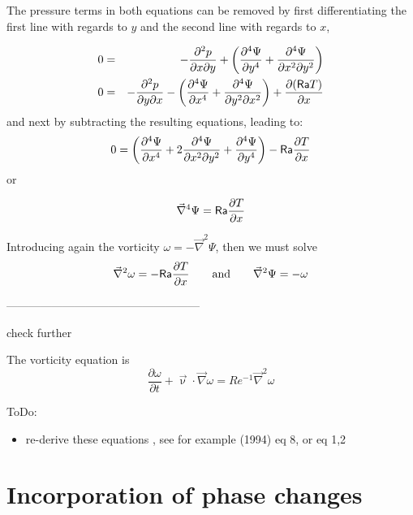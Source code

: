 The pressure terms in both equations can be removed by first differentiating
the first line with regards to $y$ and the second line with regards to $x$, 

\begin{eqnarray}
0 &=& -\frac{\partial^2 p}{\partial x\partial y} +  \left(
\frac{\partial^4 \Psi}{\partial y^4}  + \frac{\partial^4 \Psi}{\partial x^2 \partial y^2} 
\right)  \nonumber\\
0 &=& -\frac{\partial^2 p}{\partial y \partial x} -  \left(
\frac{\partial^4 \Psi}{\partial x^4}  + \frac{\partial^4 \Psi}{\partial y^2 \partial x^2} 
\right) + \frac{\partial ({\mathsf{Ra}} T)}{\partial x}
\end{eqnarray}
and next by subtracting the resulting equations, leading to:
\begin{equation}
0 = 
\left(
\frac{\partial^4 \Psi}{\partial x^4} 
+
2\frac{\partial^4 \Psi}{\partial x^2\partial y^2} 
+
\frac{\partial^4 \Psi}{\partial y^4}
\right)
- {\mathsf{Ra}} \frac{\partial T}{\partial x}
\end{equation}
or
\begin{mdframed}[backgroundcolor=blue!5]
\begin{equation}
\vec\nabla^4 \Psi = {\mathsf{Ra}}  
\frac{\partial  T}{\partial x} 
\end{equation}
\end{mdframed}

Introducing again the vorticity $\omega=-\vec\nabla^2 \Psi$, then we must solve
\[
\vec\nabla^2 \omega = -{\mathsf{Ra}}  
\frac{\partial  T}{\partial x}
\qquad
\text{and}
\qquad
\vec\nabla^2 \Psi =-\omega
\]

---------------------------------------------------

{\color{red} check further}

The vorticity equation is
\[
\frac{\partial \omega}{\partial t} +\vec\upnu \cdot \vec\nabla \omega =
Re^{-1} \vec\nabla^2 \omega
\]




\vspace{0.5cm}

{\color{orange} 
ToDo: 
\begin{itemize}
\item re-derive these equations , see for example \textcite{sope94} (1994) eq 8, 
or \textcite{kopi79} eq 1,2
\end{itemize}
}

\section{Incorporation of phase changes}

